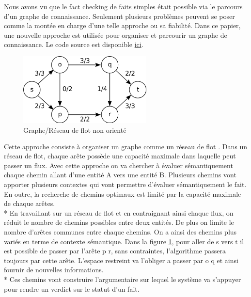 Nous avons vu que le fact checking de faits simples était possible via le parcours d'un graphe de connaissance. Seulement plusieurs problèmes peuvent se poser comme la montée en charge d'une telle approche ou sa fiabilité. Dans ce papier, une nouvelle approche est utilisée pour organiser et parcourir un graphe de connaissance. Le code source est disponible \href{https://github.com/shiralkarprashant/knowledgestream}{ici}.

\begin{figure}
  \begin{center}
    \includegraphics[width=0.6\textwidth]{imgs/max_flow.png}
  \end{center}
  \caption{Graphe/Réseau de flot non orienté}
  \label{max_flow}
\end{figure}

Cette approche consiste à organiser un graphe comme un réseau de flot \cite{shiralkar2017finding}. Dans un réseau de flot, chaque arête possède une capacité maximale dans laquelle peut passer un flux. Avec cette approche on va chercher à évaluer sémantiquement chaque chemin allant d'une entité A vers une entité B. Plusieurs chemins vont apporter plusieurs contextes qui vont permettre d'évaluer sémantiquement le fait. En outre, la recherche de chemins optimaux est limité par la capacité maximale de chaque arêtes. 
\\*
En travaillant sur un réseau de flot et en contraignant ainsi chaque flux, on réduit le nombre de chemins possibles entre deux entités. De plus on limite le nombre d'arêtes communes entre chaque chemins. On a ainsi des chemins plus variés en terme de contexte sémantique. Dans la figure \ref{max_flow}, pour aller de s vers t il est possible de passer par l'arête p \textrightarrow r, sans contraintes, l'algorithme passera toujours par cette arête. L'espace restreint va l'obliger a passer par o \textrightarrow q et ainsi fournir de nouvelles informations.
\\*
Ces chemins vont construire l'argumentaire sur lequel le système va s'appuyer pour rendre un verdict sur le statut d'un fait.

